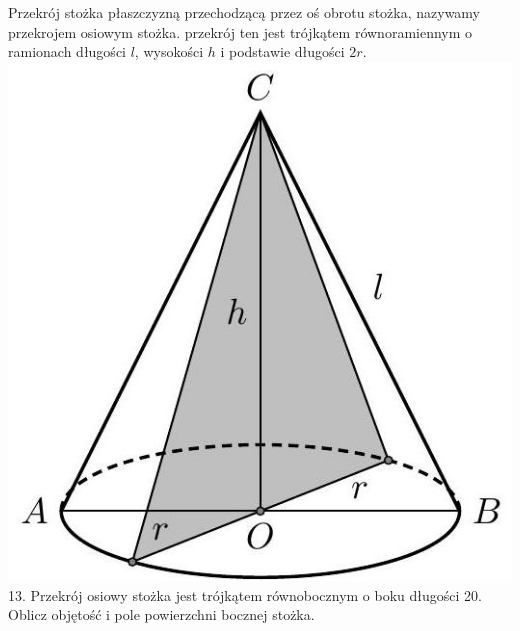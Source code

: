 \documentclass[10pt]{article}
\begin{document}
Przekrój stożka płaszczyzną przechodzącą przez oś obrotu stożka, nazywamy przekrojem osiowym stożka. przekrój ten jest trójkątem równoramiennym o ramionach długości \(l\), wysokości \(h\) i podstawie długości \(2 r\).\\
\includegraphics[max width=\textwidth, center]{2024_11_21_e9b4faa005d5be2cc318g-097(2)}\\
13. Przekrój osiowy stożka jest trójkątem równobocznym o boku długości 20. Oblicz objętość i pole powierzchni bocznej stożka.
\end{document}
